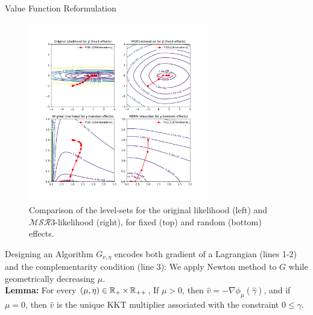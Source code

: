 \documentclass[8pt]{beamer}
\newcommand{\ouralgo}{\ensuremath{\mathcal{MSR}3}}
\begin{document}
\begin{frame}{Value Function Reformulation}
\begin{figure}
	\includegraphics[width=0.7\textwidth]{Figures/intuition_current.pdf}
	\caption{\label{fig:intuition_sr3} Comparison of the level-sets for the original likelihood (left) and $\ouralgo$-likelihood (right), for fixed (top) and random (bottom) effects.}
\end{figure}
\end{frame}

\begin{frame}{Designing an Algorithm}
	$G_{\nu,\eta}$ encodes both gradient of a Lagrangian (lines 1-2) and the complementarity condition (line 3):
	We apply Newton method to $G$ while geometrically decreasing $\mu$. \\
\textbf{Lemma:} For every $(\mu,\eta) \in \operatorname{\mathbb{R}}_+\times\operatorname{\mathbb{R}}_{++}$,
If $\mu > 0$, then $\hat{v} = -\nabla\phi_\mu(\hat{\gamma})$, and if $\mu = 0$, then $\hat{v}$ is the unique KKT multiplier associated with the constraint $0 \leq \gamma$.
\end{frame}
\end{document}
